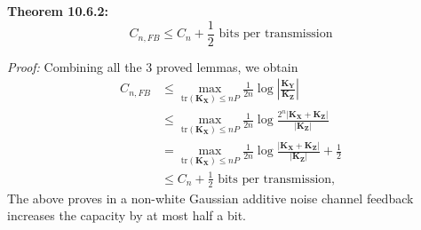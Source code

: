 \begin{tcolorbox}[boxrule=0pt,frame hidden,sharp corners,enhanced, opacityback=0, borderline west={2pt}{0pt}{blue}]
\textbf{Theorem 10.6.2:}
\begin{equation}
C_{n,FB} \leq C_n + \frac{1}{2} \text{ bits per transmission} \label{eq:10.128}
\end{equation}
\end{tcolorbox}
\textit{Proof:} Combining all the 3 proved lemmas, we obtain
\begin{align}
C_{n,FB} &\leq \max_{\text{tr}(\mathbf{K}_\mathbf{X})\leq nP} \frac{1}{2n} \log \left| \frac{\mathbf{K_Y}}{\mathbf{K_Z}} \right|  \\
&\leq \max_{\text{tr}(\mathbf{K}_\mathbf{X}) \leq nP} \frac{1}{2n} \log  \frac{2^{n}|\mathbf{K}_\mathbf{X} + \mathbf{K}_\mathbf{Z}|}{|\mathbf{K}_\mathbf{Z}|} \\
&=\max_{\text{tr}(\mathbf{K}_\mathbf{X}) \leq nP} \frac{1}{2n} \log  \frac{|\mathbf{K}_\mathbf{X} + \mathbf{K}_\mathbf{Z}|}{|\mathbf{K}_\mathbf{Z}|} + \frac{1}{2}\\
&\leq C_n + \frac{1}{2} \text{ bits per transmission}, \label{eq:10.132}
\end{align}
The above proves in a non-white Gaussian additive noise channel feedback increases the capacity by at most half a bit.





